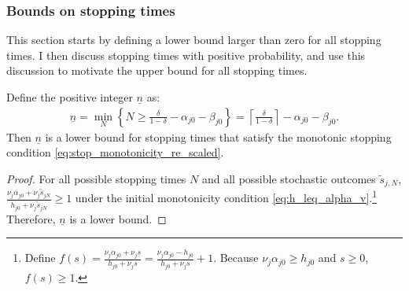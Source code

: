 \documentclass[11 pt]{article}
\newcommand{\ceil}[1]{\left\lceil #1 \right\rceil}
\newcommand{\pass}{s}
\newcommand*{\ks}[1][t]{\tilde{\pass}_{j #1}}
\begin{document}
\subsubsection*{Bounds on stopping times}

This section starts by defining a lower bound larger than zero for all stopping times.
I then discuss stopping times with positive probability, and use this discussion to motivate the upper bound for all stopping times.

\begin{lemma}
Define the positive integer $\underline{n}$ as:
\begin{align}\label{eq:lower_n}
     \underline{n} = \min_N \left\{ 
     N \geq
        \frac{\delta}{1 - \delta}
    - \alpha_{j0} - \beta_{j0}
     \right\}
     =
     \ceil{\frac{\delta}{1 - \delta}} - \alpha_{j0} - \beta_{j0}.
 \end{align}
Then $\underline{n}$ is a lower bound for stopping times that satisfy the monotonic stopping condition \eqref{eq:stop_monotonicity_re_scaled}.
\end{lemma}
\begin{proof}
For all possible stopping times $N$ and all possible stochastic outcomes $\ks[,N]$, $\frac{\nu_j \alpha_{j0} + \nu_j \ks[N]}{h_{j0} + \nu_j \ks[N]} \geq 1$ under the initial monotonicity condition \eqref{eq:h_leq_alpha_v}.\footnote{
    Define $f(s) = \frac{\nu_j \alpha_{j0} + \nu_j s}{h_{j0} + \nu_j s} = \frac{\nu_j \alpha_{j0} - h_{j0}}{h_{j0} + \nu_j s} + 1$.
    Because $\nu_j \alpha_{j0} \geq h_{j0}$ and $s \geq 0$, $f(s) \geq 1$.
}
Therefore, $\underline{n}$ is a lower bound.
\end{proof}
\end{document}
